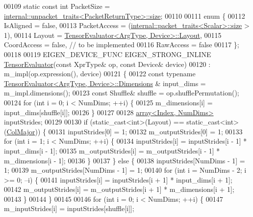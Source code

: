 \begin{DoxyCode}
00109   \textcolor{keyword}{static} \textcolor{keyword}{const} \textcolor{keywordtype}{int} PacketSize = 
      \hyperlink{struct_eigen_1_1internal_1_1unpacket__traits}{internal::unpacket\_traits<PacketReturnType>::size};
00110 
00111   \textcolor{keyword}{enum} \{
00112     IsAligned = \textcolor{keyword}{false},
00113     PacketAccess = (\hyperlink{struct_eigen_1_1internal_1_1packet__traits}{internal::packet\_traits<Scalar>::size} > 1),
00114     Layout = \hyperlink{struct_eigen_1_1_tensor_evaluator}{TensorEvaluator<ArgType, Device>::Layout},
00115     CoordAccess = \textcolor{keyword}{false},  \textcolor{comment}{// to be implemented}
00116     RawAccess = \textcolor{keyword}{false}
00117   \};
00118 
00119   EIGEN\_DEVICE\_FUNC EIGEN\_STRONG\_INLINE \hyperlink{struct_eigen_1_1_tensor_evaluator}{TensorEvaluator}(\textcolor{keyword}{const} XprType& op, \textcolor{keyword}{const} Device& 
      device)
00120       : m\_impl(op.expression(), device)
00121   \{
00122     \textcolor{keyword}{const} \textcolor{keyword}{typename} \hyperlink{struct_eigen_1_1_tensor_evaluator}{TensorEvaluator<ArgType, Device>::Dimensions}
      & input\_dims = m\_impl.dimensions();
00123     \textcolor{keyword}{const} Shuffle& shuffle = op.shufflePermutation();
00124     \textcolor{keywordflow}{for} (\textcolor{keywordtype}{int} i = 0; i < NumDims; ++i) \{
00125       m\_dimensions[i] = input\_dims[shuffle[i]];
00126     \}
00127 
00128     \hyperlink{class_eigen_1_1array}{array<Index, NumDims>} inputStrides;
00129 
00130     \textcolor{keywordflow}{if} (static\_cast<int>(Layout) == static\_cast<int>(\hyperlink{group__enums_ggaacded1a18ae58b0f554751f6cdf9eb13a0cbd4bdd0abcfc0224c5fcb5e4f6669a}{ColMajor})) \{
00131       inputStrides[0] = 1;
00132       m\_outputStrides[0] = 1;
00133       \textcolor{keywordflow}{for} (\textcolor{keywordtype}{int} i = 1; i < NumDims; ++i) \{
00134         inputStrides[i] = inputStrides[i - 1] * input\_dims[i - 1];
00135         m\_outputStrides[i] = m\_outputStrides[i - 1] * m\_dimensions[i - 1];
00136       \}
00137     \} \textcolor{keywordflow}{else} \{
00138       inputStrides[NumDims - 1] = 1;
00139       m\_outputStrides[NumDims - 1] = 1;
00140       \textcolor{keywordflow}{for} (\textcolor{keywordtype}{int} i = NumDims - 2; i >= 0; --i) \{
00141         inputStrides[i] = inputStrides[i + 1] * input\_dims[i + 1];
00142         m\_outputStrides[i] = m\_outputStrides[i + 1] * m\_dimensions[i + 1];
00143       \}
00144     \}
00145 
00146     \textcolor{keywordflow}{for} (\textcolor{keywordtype}{int} i = 0; i < NumDims; ++i) \{
00147       m\_inputStrides[i] = inputStrides[shuffle[i]];

\end{DoxyCode}
